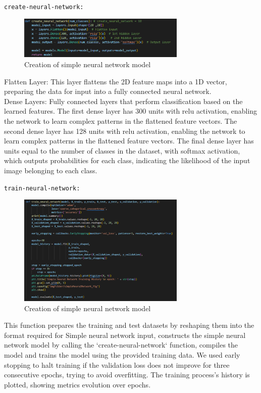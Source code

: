 \documentclass{article}
\newcommand{\code}[1]{\colorbox{light-gray}{\texttt{#1}}}
\begin{document}
\code{create-neural-network:}\\\newline
\begin{figure}[H]
    \caption{Creation of simple neural network model}
    \centering
    \includegraphics[width=8cm]{imgFolder/create-neural-network-code.png}
\end{figure}

Flatten Layer: This layer flattens the 2D feature maps into a 1D vector,
preparing the data for input into a fully connected neural network.\\\newline
Dense Layers: Fully connected layers that perform classification based on the learned features.
The first dense layer has 300 units with relu activation, enabling the network to learn complex
patterns in the flattened feature vectors.
The second dense layer has 128 units with relu activation, enabling the network to learn complex
patterns in the flattened feature vectors.
The final dense layer has units equal to the number of classes
in the dataset, with softmax activation, which outputs probabilities for each class,
indicating the likelihood of the input image belonging to each class.\\\newline

\code{train-neural-network:}
\\\newline
\begin{figure}[H]
    \caption{Creation of simple neural network model}
    \centering
    \includegraphics[width=8cm]{imgFolder/train_neural_network-code.png}
\end{figure}
This function prepares the training and test datasets by reshaping them into the format
required for Simple neural network input, constructs the simple neural network model by calling the `create-neural-network` function,
compiles the model and trains the model using the provided training data.
We used early stopping to halt training if the validation loss does not improve for three consecutive epochs,
trying to avoid overfitting.
The training process's history is plotted, showing metrics evolution over epochs.
\newpage
\end{document}
